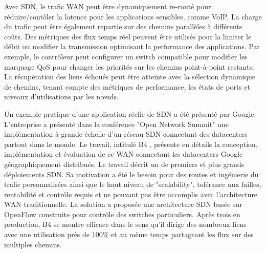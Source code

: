 Avec SDN, le trafic WAN peut être dynamiquement re-routé pour réduire/contôler la latence pour les applications sensibles, comme VoIP. La charge du trafic peut être également repartie sur des chemins parallèles à différents coûts.
Des métriques des flux temps réel peuvent être utilisés pour la limiter le débit ou modifier la transmission optimisant la performance des applications. Par exemple, le contrôleur peut configurer un switch compatible pour modifier les marquage QoS pour changer les priorités sur les chemins point-à-point restants.
La récupération des liens échoués peut être atteinte avec la sélection dynamique de chemins, tenant compte des métriques de performance, les états de ports et niveaux d'utilisations par les nœuds.

Un exemple pratique d'une application réelle de SDN a été présenté par Google. L'entreprise a présenté dans la conférence "Open Network Summit" \cite{googleONS} une implémentation à grande échelle d'un réseau SDN connectant des \glspl{datacenter} partout dans le monde. Le travail, intitulé B4 \cite{SDNWANB4}, présente en détails la conception, implémentation et évaluation de ce WAN connectant les \glspl{datacenter} Google géographiquement distribués. Le travail décrit un de premiers et plus grands déploiements SDN. Sa motivation a été le besoin pour des routes et ingénierie du trafic personnalisées ainsi que le haut niveau de "scalability", tolérance aux failles, rentabilité et contrôle requis et ne pouvant pas être accomplis avec l'architecture WAN traditionnelle. La solution a proposée une architecture SDN basée sur OpenFlow construite pour contrôle des switches particuliers. Après trois en production, B4 se montre efficace dans le sens qu'il dirige des nombreux liens avec une utilisation près de 100\% et au même temps partageant les flux sur des multiples chemins. \cite{SurveySDNApplications}


